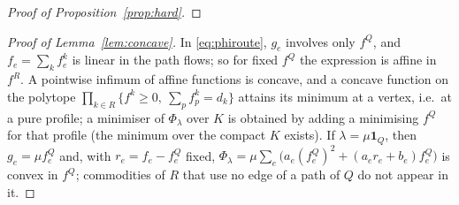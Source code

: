 \documentclass[11pt,a4paper]{article}
\theoremstyle{plain}
\theoremstyle{definition}
\theoremstyle{remark}
\begin{document}
\begin{proof}[Proof of Proposition~\ref{prop:hard}]
\end{proof}


\begin{proof}[Proof of Lemma~\ref{lem:concave}]
In \eqref{eq:phiroute}, $g_e$ involves only $f^Q$, and $f_e=\sum_kf^k_e$ is linear in the path flows; so for fixed $f^Q$ the expression is affine in $f^R$. A pointwise infimum of affine functions is concave, and a concave function on the polytope $\prod_{k\in R}\{f^k\ge0,\ \sum_pf^k_p=d_k\}$ attains its minimum at a vertex, i.e.\ at a pure profile; a minimiser of $\Phi_\lambda$ over $K$ is obtained by adding a minimising $f^Q$ for that profile (the minimum over the compact $K$ exists). If $\lambda=\mu\mathbf 1_Q$, then $g_e=\mu f^Q_e$ and, with $r_e=f_e-f^Q_e$ fixed, $\Phi_\lambda=\mu\sum_e\big(a_e(f^Q_e)^2+(a_er_e+b_e)f^Q_e\big)$ is convex in $f^Q$; commodities of $R$ that use no edge of a path of $Q$ do not appear in it.
\end{proof}
\end{document}
